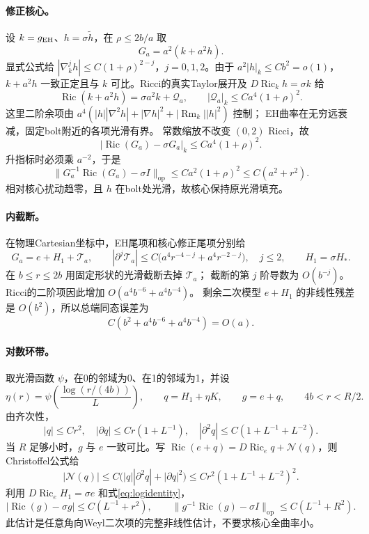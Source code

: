 \documentclass[UTF8,a4paper,11pt,fontset=fandol]{ctexart}
\numberwithin{equation}{section}
\theoremstyle{definition}
\newcommand{\Ric}{\operatorname{Ric}}
\newcommand{\Rm}{\operatorname{Rm}}
\newcommand{\op}{\mathrm{op}}
\begin{document}
\paragraph{修正核心。}
设 $k=g_{\rm EH}$、$h=\sigma\widetilde h$，在 $\rho\le2b/a$ 取
\[
G_a=a^2(k+a^2h).
\]
显式公式给 $|\nabla_k^jh|\le C(1+\rho)^{2-j}$，$j=0,1,2$。由于
$a^2|h|_k\le Cb^2=o(1)$，$k+a^2h$ 一致正定且与 $k$ 可比。Ricci的真实Taylor展开及 $D\Ric_kh=\sigma k$ 给
\[
\Ric(k+a^2h)=\sigma a^2k+\mathcal Q_a,\qquad
|\mathcal Q_a|_k\le Ca^4(1+\rho)^2.
\]
这里二阶余项由
$a^4(|h||\nabla^2h|+|\nabla h|^2+|\Rm_k||h|^2)$ 控制；
EH曲率在无穷远衰减，固定bolt附近的各项光滑有界。
常数缩放不改变 $(0,2)$ Ricci，故
\[
|\Ric(G_a)-\sigma G_a|_k\le Ca^4(1+\rho)^2.
\]
升指标时必须乘 $a^{-2}$，于是
\begin{equation}\label{eq:coreestimate}
\|G_a^{-1}\Ric(G_a)-\sigma I\|_{\op}
\le C a^2(1+\rho)^2\le C(a^2+r^2).
\end{equation}
相对核心扰动趋零，且 $h$ 在bolt处光滑，故核心保持原光滑填充。

\paragraph{内截断。}
在物理Cartesian坐标中，EH尾项和核心修正尾项分别给
\[
G_a=e+H_1+\mathcal T_a,\qquad
|\partial^j\mathcal T_a|
\le C\bigl(a^4r^{-4-j}+a^4r^{-2-j}\bigr),\quad j\le2,
\qquad H_1=\sigma H_*.
\]
在 $b\le r\le2b$ 用固定形状的光滑截断去掉 $\mathcal T_a$；
截断的第 $j$ 阶导数为 $O(b^{-j})$。
Ricci的二阶项因此增加
$O(a^4b^{-6}+a^4b^{-4})$。
剩余二次模型 $e+H_1$ 的非线性残差是 $O(b^2)$，所以总端同态误差为
\begin{equation}\label{eq:innercutoff}
C(b^2+a^4b^{-6}+a^4b^{-4})=O(a).
\end{equation}

\paragraph{对数环带。}
取光滑函数 $\psi$，在0的邻域为0、在1的邻域为1，并设
\[
\eta(r)=\psi\!\left(\frac{\log(r/(4b))}{L}\right),\qquad
q=H_1+\eta K,\qquad g=e+q,\qquad 4b<r<R/2.
\]
由齐次性，
\[
|q|\le Cr^2,\quad
|\partial q|\le Cr(1+L^{-1}),\quad
|\partial^2q|\le C(1+L^{-1}+L^{-2}).
\]
当 $R$ 足够小时，$g$ 与 $e$ 一致可比。写
$\Ric(e+q)=D\Ric_e q+\mathcal N(q)$，则Christoffel公式给
\[
|\mathcal N(q)|\le C\bigl(|q||\partial^2q|+|\partial q|^2\bigr)
\le Cr^2(1+L^{-1}+L^{-2})^2.
\]
利用 $D\Ric_eH_1=\sigma e$ 和式\eqref{eq:logidentity}，
\[
|\Ric(g)-\sigma g|
\le C(L^{-1}+r^2),\qquad
\|g^{-1}\Ric(g)-\sigma I\|_{\op}
\le C(L^{-1}+R^2).
\]
此估计是任意角向Weyl二次项的完整非线性估计，不要求核心全曲率小。
\end{document}
